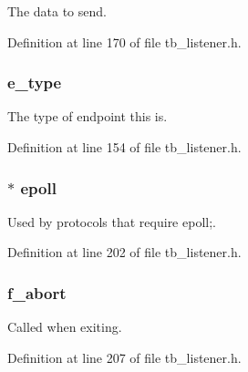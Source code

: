 The data to send. 



Definition at line 170 of file tb\-\_\-listener.\-h.

\hypertarget{structtb__listener__t_abbd1eee27b1b57dcb1f57b2ef4b4fa12}{
\subsubsection[{e\-\_\-type}]{ e\-\_\-type}}\label{structtb__listener__t_abbd1eee27b1b57dcb1f57b2ef4b4fa12}


The type of endpoint this is. 



Definition at line 154 of file tb\-\_\-listener.\-h.

\hypertarget{structtb__listener__t_af7fbbda1b15f6051fb8cead0ada5ce7e}{
\subsubsection[{epoll}]{$\ast$ epoll}}\label{structtb__listener__t_af7fbbda1b15f6051fb8cead0ada5ce7e}


Used by protocols that require epoll;. 



Definition at line 202 of file tb\-\_\-listener.\-h.

\hypertarget{structtb__listener__t_a385e4cbcf683dd35d7d80c9726c8c67d}{
\subsubsection[{f\-\_\-abort}]{ f\-\_\-abort}}\label{structtb__listener__t_a385e4cbcf683dd35d7d80c9726c8c67d}


Called when exiting. 



Definition at line 207 of file tb\-\_\-listener.\-h.

